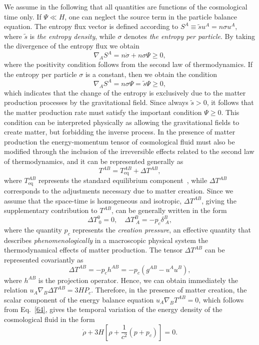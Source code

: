\documentclass[aps,superscriptaddress, showpacs,preprintnumbers, superscriptaddress, nofootinbibt,twocolumn]{revtex4-2}
\begin{document}
We assume in the following that all quantities are functions of the cosmological time only. If $\Psi \ll H$, one can neglect the source term in the particle balance equation. The entropy flux vector is defined according to $S^{A} \equiv \tilde{s}u^{A} = n\sigma u^{A}$, where $\tilde{s}$ is {\it the entropy density}, while $%
\sigma $ denotes {\it the entropy per particle}. By taking the divergence of the entropy flux
we obtain
\begin{equation}  \label{62b}
\nabla _{A}S^{A}=n\dot{\sigma}+n\sigma \Psi\geq 0,
\end{equation}
where the positivity condition follows from the second law of thermodynamics. If the entropy per particle  $\sigma $ is a constant, then we obtain the condition
\begin{equation}
\nabla _{A}S^{A}=n\sigma \Psi =\tilde{s}\Psi\geq 0,
\end{equation}
which indicates that the change of the entropy is exclusively due to the matter production processes by the gravitational field. Since always $\tilde{s}>0$, it follows that the matter production rate must satisfy the important condition $\Psi \geq 0$. This condition can be interpreted physically as allowing the gravitational fields to create matter, but forbidding the inverse process. In the presence of matter  production the
energy-momentum tensor of cosmological fluid  must also be modified through the inclusion of the irreversible effects related to the second law of thermodynamics, and it can be represented generally as \cite{Bar}
\begin{equation}\label{64}
T^{AB}=T^{A B}_\text{eq}+\Delta T^{AB},
\end{equation}
where $T^{AB}_\text{eq}$ represents the standard equilibrium component~\cite{Bar}, while $\Delta T^{AB}$ corresponds to the adjustments necessary due to
matter creation. Since we assume that the space-time is homogeneous and isotropic, $\Delta T^{AB}$, giving the supplementary
contribution to $T^{AB}$, can be generally written in the form
\begin{equation}
\Delta T_{\; 0}^0=0, \quad \Delta T_{\; A}^B=-p_c\delta_{\; A}^B,
\end{equation}
where the quantity $p_c$ represents the \textit{creation pressure}, an effective quantity that  describes
{\it phenomenologically} in a macroscopic physical system the thermodynamical effects of matter production. The tensor $\Delta T^{AB}$ can be represented covariantly as \cite{Bar}
\begin{equation}
\Delta T^{A B}=-p_ch^{AB}=-p_c\left(g^{A B}-u^{A}u^{B}\right),
\end{equation}
where $h^{AB}$ is the projection operator. Hence, we can obtain immediately the relation  $u_{A}\nabla _{B}\Delta T^{A B}=3HP_c$.
Therefore, in the presence of matter creation, the scalar component of the energy balance
equation $u_{A}\nabla _{B}T^{A B}=0$, which follows from Eq.~\eqref{64}, gives the temporal variation of the energy density of the cosmological fluid in the form
\begin{equation}\label{cons1}
\dot{\rho}+3H\left[\rho+\frac{1}{c^2}\left(p+p_c\right)\right]=0.
\end{equation}
\end{document}

